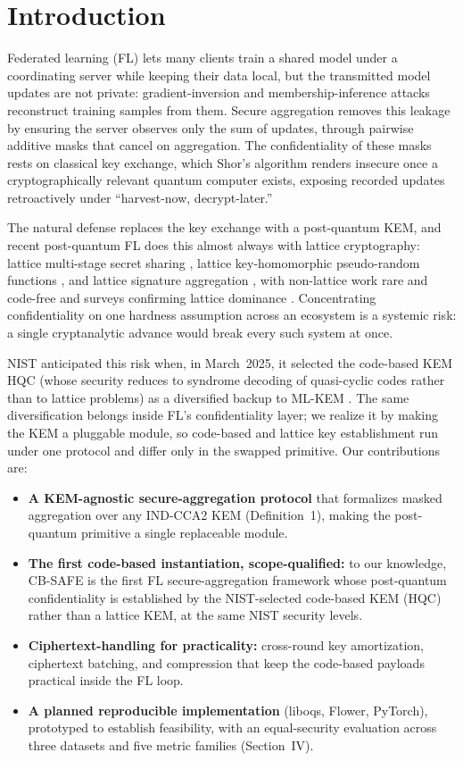\documentclass[conference]{IEEEtran}
\begin{document}
\section{Introduction}
Federated learning (FL) lets many clients train a shared model under a coordinating server while
keeping their data local, but the transmitted model updates are not private: gradient-inversion
and membership-inference attacks reconstruct training samples from them. Secure aggregation removes
this leakage by ensuring the server observes only the sum of updates, through pairwise additive
masks that cancel on aggregation. The confidentiality of these masks rests on classical key
exchange, which Shor's algorithm renders insecure once a cryptographically relevant quantum
computer exists, exposing recorded updates retroactively under ``harvest-now, decrypt-later.''

The natural defense replaces the key exchange with a post-quantum KEM, and recent post-quantum FL
does this almost always with lattice cryptography: lattice multi-stage secret sharing
\cite{pqsf2024}, lattice key-homomorphic pseudo-random functions \cite{qinxu2025}, and lattice
signature aggregation \cite{narsimhulu2026}, with non-lattice work rare and code-free
\cite{singh2025pqfog} and surveys confirming lattice dominance \cite{nguyen2025lattice}.
Concentrating confidentiality on one hardness assumption across an ecosystem is a systemic risk:
a single cryptanalytic advance would break every such system at once.

NIST anticipated this risk when, in March~2025, it selected the code-based KEM HQC (whose security
reduces to syndrome decoding of quasi-cyclic codes rather than to lattice problems) as a
diversified backup to ML-KEM \cite{nistir8545}. The same diversification belongs inside FL's
confidentiality layer; we realize it by making the KEM a pluggable module, so code-based and
lattice key establishment run under one protocol and differ only in the swapped primitive. Our
contributions are:

\begin{itemize}
\item \textbf{A KEM-agnostic secure-aggregation protocol} that formalizes masked aggregation over
any IND-CCA2 KEM (Definition~1), making the post-quantum primitive a single replaceable module.
\item \textbf{The first code-based instantiation, scope-qualified:} to our knowledge, CB-SAFE is
the first FL secure-aggregation framework whose post-quantum confidentiality is established by the
NIST-selected code-based KEM (HQC) rather than a lattice KEM, at the same NIST security levels.
\item \textbf{Ciphertext-handling for practicality:} cross-round key amortization, ciphertext
batching, and compression that keep the code-based payloads practical inside the FL loop.
\item \textbf{A planned reproducible implementation} (liboqs, Flower, PyTorch), prototyped to
establish feasibility, with an equal-security evaluation across three datasets and five metric
families (Section~IV).
\end{itemize}
\end{document}
